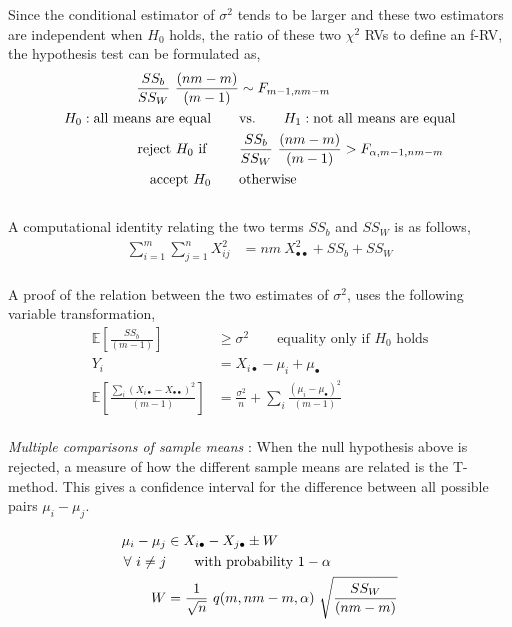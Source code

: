 Since the conditional estimator of $ \sigma^2 $ tends to be larger and these two estimators are independent when $ H_0 $ holds, the ratio of these two $ \chi^2 $ RVs to define an f-RV, the hypothesis test can be formulated as,\\

\begin{align}
	\frac{SS_b}{SS_W}\ \frac{(nm-m)}{(m-1)} &\sim F_{m-1, nm-m} \nonumber \\
	H_0 : \text{all means are equal} \qquad &\text{vs.} \qquad H_1 : \text{not all means are equal} \nonumber \\
	\text{reject $ H_0 $ if } \qquad & \frac{SS_b}{SS_W}\ \frac{(nm-m)}{(m-1)} > F_{\alpha, m-1, nm-m}  \nonumber \\
	\text{accept $ H_0 $} \qquad & \text{otherwise}
\end{align}\\

A computational identity relating the two terms $ SS_b $ and $ SS_W $ is as follows,\\

\begin{align}
	\sum\limits_{i = 1}^{m} \sum\limits_{j = 1}^{n} X^2_{ij} &= nm\ X^2_{\bullet \bullet} + SS_b + SS_W
\end{align} \\

A proof of the relation between the two estimates of $ \sigma^2 $, uses the following variable transformation, \\

\begin{align}
	\mathbb{E}\left[\frac{SS_b}{(m-1)}\right] &\geq \sigma^2 \qquad \text{equality only if $H_0$ holds} \\
	Y_i &= X_{i\bullet} -\mu_i + \mu_{\bullet} \nonumber \\
	\mathbb{E}\left[\frac{\sum_{i} (X_{i\bullet} - X_{\bullet\bullet})^2}{(m-1)}\right] &= \frac{\sigma^2}{n} + \sum_{i} \frac{(\mu_i - \mu_{\bullet})^2}{(m-1)}
\end{align}\\

\textit{Multiple comparisons of sample means} : When the null hypothesis above is rejected, a measure of how the different sample means are related is the T-method. This gives a confidence interval for the difference between all possible pairs $ \mu_i - \mu_j $. 

\begin{align}
	\mu_i - \mu_j &\in X_{i\bullet} - X_{j\bullet} \pm W \\
	\forall \ i\neq j &\qquad \text{with probability $ 1-\alpha $} \nonumber \\
	W &= \frac{1}{\sqrt{n}} \ q(m, nm-m, \alpha)\ \sqrt{\frac{SS_W}{(nm-m)}}
\end{align}\\


